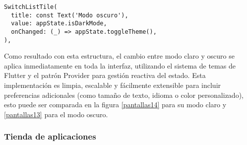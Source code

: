 \begin{verbatim}
SwitchListTile(
  title: const Text('Modo oscuro'),
  value: appState.isDarkMode,
  onChanged: (_) => appState.toggleTheme(),
),
\end{verbatim}
Como resultado con esta estructura, el cambio entre modo claro y oscuro se aplica inmediatamente en toda la interfaz, utilizando el sistema de temas de Flutter y el patrón Provider para gestión reactiva del estado. Esta implementación es limpia, escalable y fácilmente extensible para incluir preferencias adicionales (como tamaño de texto, idioma o color personalizado), esto puede ser comparada en la figura \ref{pantallas14} para su modo claro y \ref{pantallas13} para el modo oscuro.



\subsubsection{Tienda de aplicaciones}







